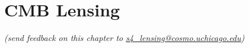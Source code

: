  
\chapter{CMB Lensing}

\begin{center}
{\small \it (send feedback on this chapter to \href{mailto:s4_lensing@cosmo.uchicago.edu}{s4\_lensing@cosmo.uchicago.edu})}
\end{center}



\def\nnu{N_{\mathrm eff}}
\def\gtrsim{\raise-.75ex\hbox{$\buildrel>\over\sim$}}


